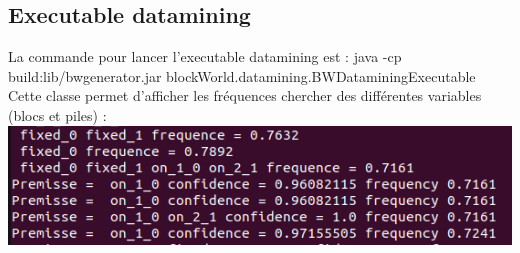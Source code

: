 \documentclass[12pt]{article}
\begin{document}
		\subsection{Executable datamining}
			La commande pour lancer l'executable datamining est : java -cp build:lib/bwgenerator.jar blockWorld.datamining.BWDataminingExecutable
			\\Cette classe permet d'afficher les fréquences chercher des différentes variables (blocs et piles) :\\
			\includegraphics[width=1\textwidth]{image/frequence.png}
\end{document}
